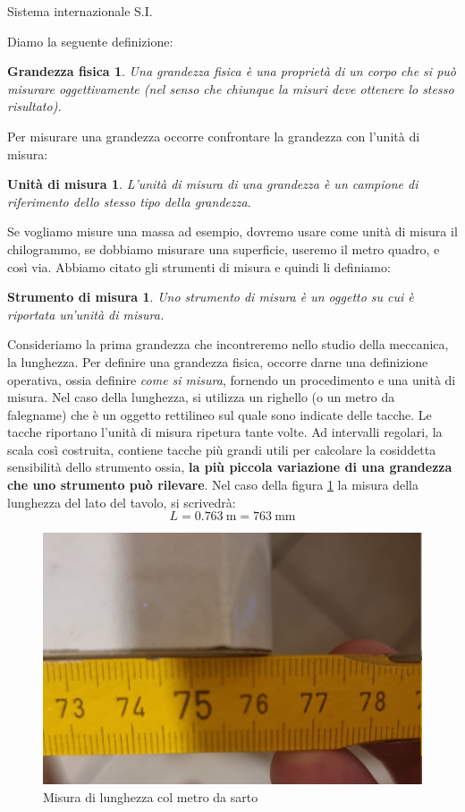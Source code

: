 \documentclass[12pt,a4paper,oneside]{book}
\makeatletter
\newtheorem{grf}{Grandezza fisica}
\newtheorem{udm}{Unità di misura}
\newtheorem{sdm}{Strumento di misura}
\renewcommand{\section}{\@startsection{section}{1}{\z@}
{-4ex \@plus -1ex \@minus -.4ex}
{1ex \@plus.2ex }
{\normalfont\large\sffamily\bfseries}}
\theoremstyle{esercizio}
\makeatother
\begin{document}
\section{Sistema internazionale S.I.}

Diamo la seguente definizione:
\begin{grf}
	Una grandezza fisica è una proprietà di un corpo che si può misurare oggettivamente (nel senso che chiunque la misuri deve ottenere lo stesso risultato).
\end{grf}

Per misurare una grandezza occorre confrontare la grandezza con l'unità di misura:
\begin{udm}
    L'unità di misura di una grandezza è un campione di riferimento dello stesso tipo della grandezza.
\end{udm}
Se vogliamo misure una massa ad esempio, dovremo usare come unità di misura il chilogrammo, se dobbiamo misurare
una superficie, useremo il metro quadro, e così via. Abbiamo citato gli strumenti di misura e quindi li definiamo:
\begin{sdm}
Uno strumento di misura è un oggetto su cui è riportata un'unità di misura.
\end{sdm}

 Consideriamo la prima grandezza che incontreremo nello studio della meccanica, la lunghezza. Per definire una grandezza fisica, occorre darne una definizione operativa, ossia definire \textit{come si misura}, fornendo un procedimento e una unità di misura. Nel caso della lunghezza, si utilizza un righello (o un metro da falegname) che è un oggetto rettilineo sul quale sono indicate delle tacche. Le tacche riportano l'unità di misura ripetura tante volte. Ad intervalli regolari, la scala così costruita, contiene tacche più grandi utili per calcolare la cosiddetta sensibilità dello strumento ossia, \textbf{la più piccola variazione di una grandezza che uno strumento può rilevare}. Nel caso della  figura \ref{fig:lun} la misura della lunghezza del lato del tavolo, si scrivedrà:
 \[
 L=\SI{0,763}{\meter} =\SI{763}{\milli\meter}
 \]
 
    \begin{figure}[h!]
    \centering
    \includegraphics[width=0.5\linewidth]{img/lun.jpg} 
    \caption{Misura di lunghezza col metro da sarto}
    \label{fig:lun}
\end{figure}  
 
\end{document}
